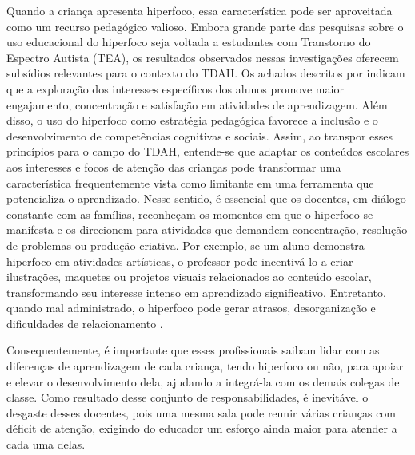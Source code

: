 Quando a criança apresenta hiperfoco, essa característica pode ser aproveitada como um recurso pedagógico valioso. Embora grande parte das pesquisas sobre o uso educacional do hiperfoco seja voltada a estudantes com Transtorno do Espectro Autista (TEA), os resultados observados nessas investigações oferecem subsídios relevantes para o contexto do TDAH. Os achados descritos por \cite{Souza2024} indicam que a exploração dos interesses específicos dos alunos promove maior engajamento, concentração e satisfação em atividades de aprendizagem. Além disso, o uso do hiperfoco como estratégia pedagógica favorece a inclusão e o desenvolvimento de competências cognitivas e sociais. Assim, ao transpor esses princípios para o campo do TDAH, entende-se que adaptar os conteúdos escolares aos interesses e focos de atenção das crianças pode transformar uma característica frequentemente vista como limitante em uma ferramenta que potencializa o aprendizado. Nesse sentido, é essencial que os docentes, em diálogo constante com as famílias, reconheçam os momentos em que o hiperfoco se manifesta e os direcionem para atividades que demandem concentração, resolução de problemas ou produção criativa. Por exemplo, se um aluno demonstra hiperfoco em atividades artísticas, o professor pode incentivá-lo a criar ilustrações, maquetes ou projetos visuais relacionados ao conteúdo escolar, transformando seu interesse intenso em aprendizado significativo. Entretanto, quando mal administrado, o hiperfoco pode gerar atrasos, desorganização e dificuldades de relacionamento \cite{Cellera2025}.


Consequentemente,  é importante que esses profissionais saibam lidar com as diferenças de aprendizagem de cada criança, tendo hiperfoco ou não, para apoiar e elevar o desenvolvimento dela, ajudando a integrá-la com os demais colegas de classe. Como resultado desse conjunto de responsabilidades, é inevitável o desgaste desses docentes, pois uma mesma sala pode reunir várias crianças com déficit de atenção, exigindo do educador um esforço ainda maior para atender a cada uma delas. 

